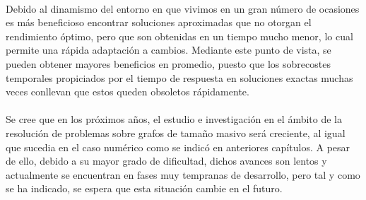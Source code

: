 \documentclass{subfiles}
\begin{document}
      \paragraph{}
      Debido al dinamismo del entorno en que vivimos en un gran número de ocasiones es más beneficioso encontrar soluciones aproximadas que no otorgan el rendimiento óptimo, pero que son obtenidas en un tiempo mucho menor, lo cual permite una rápida adaptación a cambios. Mediante este punto de vista, se pueden obtener mayores beneficios en promedio, puesto que los sobrecostes temporales propiciados por el tiempo de respuesta en soluciones exactas muchas veces conllevan que estos queden obsoletos rápidamente.

      \paragraph{}
      Se cree que en los próximos años, el estudio e investigación en el ámbito de la resolución de problemas sobre grafos de tamaño masivo será creciente, al igual que sucedia en el caso numérico como se indicó en anteriores capítulos. A pesar de ello, debido a su mayor grado de dificultad, dichos avances son lentos y actualmente se encuentran en fases muy tempranas de desarrollo, pero tal y como se ha indicado, se espera que esta situación cambie en el futuro.
\end{document}
